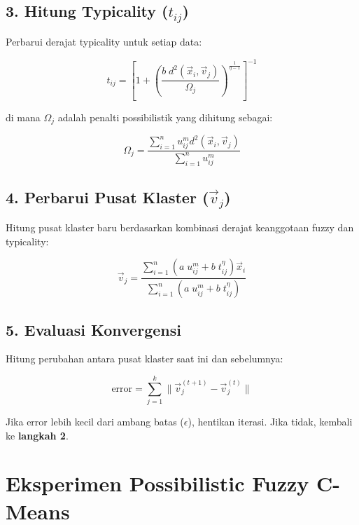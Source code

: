 \documentclass[
  oneside]{book}
\begin{document}
\subsection*{\texorpdfstring{3. Hitung Typicality (\(t_{ij}\))}{3. Hitung Typicality (t\_\{ij\})}}\label{hitung-typicality-t_ij}

Perbarui derajat typicality untuk setiap data:

\[
t_{ij} = \left[1 + \left(\frac{b \; d^2(\vec{x}_i, \vec{v}_j)}{\Omega_j}\right)^{\frac{1}{\eta-1}}\right]^{-1}
\]

di mana \(\Omega_j\) adalah penalti possibilistik yang dihitung sebagai:

\[
\Omega_j = \frac{\sum_{i=1}^n u_{ij}^m d^2(\vec{x}_i, \vec{v}_j)}{\sum_{i=1}^n u_{ij}^m}
\]

\subsection*{\texorpdfstring{4. Perbarui Pusat Klaster (\(\vec{v}_j\))}{4. Perbarui Pusat Klaster (\textbackslash vec\{v\}\_j)}}\label{perbarui-pusat-klaster-vecv_j}

Hitung pusat klaster baru berdasarkan kombinasi derajat keanggotaan fuzzy dan typicality:

\[
\vec{v}_j = \frac{\sum_{i=1}^n \left(a \; u_{ij}^m + b \; t_{ij}^\eta\right) \vec{x}_i}{\sum_{i=1}^n \left(a \; u_{ij}^m + b \; t_{ij}^\eta\right)}
\]

\subsection*{5. Evaluasi Konvergensi}\label{evaluasi-konvergensi-1}

Hitung perubahan antara pusat klaster saat ini dan sebelumnya:

\[
\text{error} = \sum_{j=1}^k \|\vec{v}_j^{(t+1)} - \vec{v}_j^{(t)}\|
\]

Jika \(\text{error}\) lebih kecil dari ambang batas (\(\epsilon\)), hentikan iterasi. Jika tidak, kembali ke \textbf{langkah 2}.

\section{Eksperimen Possibilistic Fuzzy C-Means}\label{eksperimen-possibilistic-fuzzy-c-means}
\end{document}
